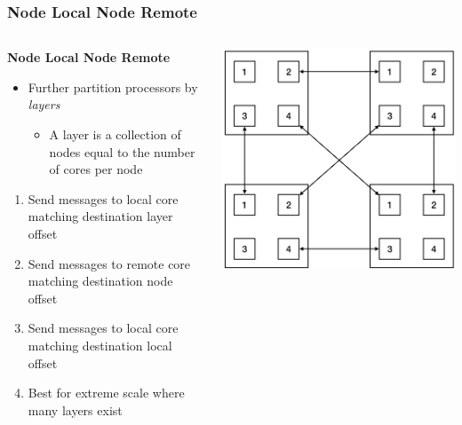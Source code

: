 \documentclass{beamer}
\begin{document}
\begin{frame}
\frametitle{Node Local Node Remote}


\begin{columns}
\begin{column}{0.7\textwidth}
	\textbf{Node Local Node Remote}
	\begin{itemize}
		\item Further partition processors by \emph{layers}
		\begin{itemize}
			\item A layer is a collection of nodes equal to the number of cores per node
		\end{itemize}
	\end{itemize}
	\begin{enumerate}
		\item Send messages to local core matching destination layer offset
		\item Send messages to remote core matching destination node offset
		\item Send messages to local core matching destination local offset
		\item Best for extreme scale where many layers exist
	\end{enumerate}
\end{column}
\begin{column}{0.3\textwidth}  %
\begin{center}
	\includegraphics[width=1.0\textwidth]{intra_layer_nlnr}

\end{center}
\end{column}
\end{columns}
\end{frame}
\end{document}
